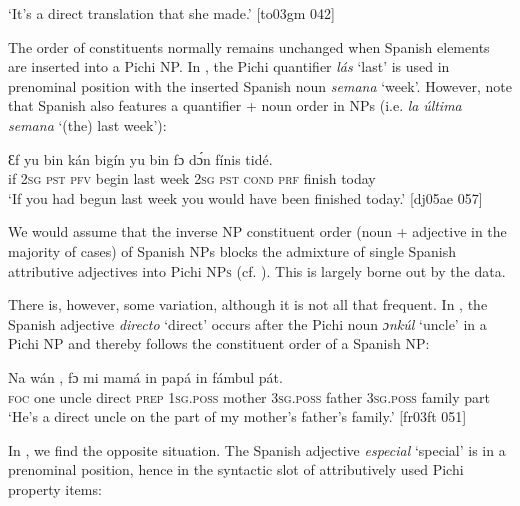 \glt ‘It’s a direct translation that she made.’ [to03gm 042]
\z

The order of constituents normally remains unchanged when Spanish elements are inserted into a Pichi NP. In , the Pichi quantifier \textit{lás} ‘last’ is used in prenominal position with the inserted Spanish noun \textit{semana} ‘week’. However, note that Spanish also features a quantifier + noun order in NPs (i.e. \textit{la} \textit{última} \textit{semana} ‘(the) last week’):


\ea%
    \label{ex:key:1703}
    \gll Ɛf  yu  bin  kán  bigín      yu  bin  fɔ    dɔ́n  fínis    tidé.\\
if  \textsc{2sg}  \textsc{pst}  \textsc{pfv}  begin  last  week  \textsc{2sg}  \textsc{pst}  \textsc{cond}    \textsc{prf}  finish  today\\

\glt ‘If you had begun last week you would have been finished today.’ [dj05ae 057] 
\z

We would assume that the inverse \textsc{NP} constituent order (noun + adjective in the majority of cases) of Spanish NPs blocks the admixture of single Spanish attributive adjectives into Pichi \textsc{NPs} (cf. \citealt{SankoffPoplack1981}). This is largely borne out by the data.


There is, however, some variation, although it is not all that frequent. In , the Spanish adjective \textit{directo} ‘direct’ occurs after the Pichi noun \textit{ɔnkúl} ‘uncle’\textit{} in a Pichi NP and thereby follows the constituent order of a Spanish \textsc{NP}:



\ea%
    \label{ex:key:1704}
    \gll Na  wán       ,  fɔ  mi    mamá  in    papá
in    fámbul  pát.\\
\textsc{foc}  one    uncle  direct  \textsc{prep}  \textsc{1sg.poss}  mother  \textsc{3sg.poss}  father
\textsc{3sg.poss}  family  part\\

\glt ‘He’s a direct uncle on the part of my mother’s father’s family.’ [fr03ft 051]
\z

In , we find the opposite situation. The Spanish adjective \textit{especial} ‘special’ is in a prenominal position, hence in the syntactic slot of attributively used Pichi property items: 


